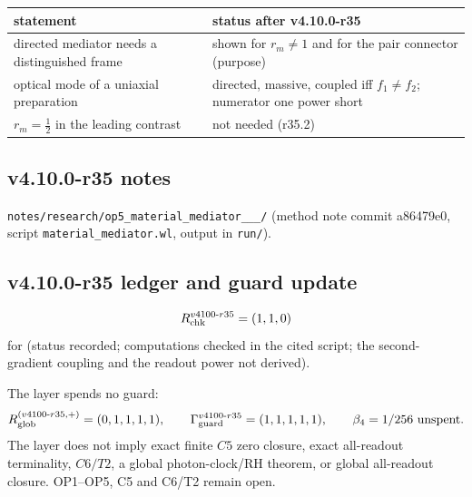 \begin{center}
\small
\begin{tabular}{@{}>{\raggedright\arraybackslash}p{}>{\raggedright\arraybackslash}p{}@{}}
\toprule
statement & status after v4.10.0-r35\\
\midrule
directed mediator needs a distinguished frame & shown for \(r_m\neq1\) and for the pair connector (purpose)\\
optical mode of a uniaxial preparation & directed, massive, coupled iff \(f_1\neq f_2\); numerator one power short\\
\(r_m=\tfrac12\) in the leading contrast & not needed (r35.2)\\
\bottomrule
\end{tabular}
\end{center}

\subsection*{v4.10.0-r35 notes}
\label{subsec:v4100-r35-notes}

\texttt{notes/\allowbreak research/\allowbreak op5\_\allowbreak material\_\allowbreak mediator\_\_\_/} (method note commit a86479e0,
script \texttt{material\_\allowbreak mediator.wl}, output in \texttt{run/}).

\subsection*{v4.10.0-r35 ledger and guard update}
\label{subsec:v4100-r35-ledger-guard}

\[
R_{\rm chk}^{v4100\text{-}r35}=(1,1,0)
\]
for (status recorded; computations checked in the cited script; the second-gradient coupling and the readout power not derived).

The layer spends no guard:
\[
R_{\rm glob}^{(v4100\text{-}r35,+)}=(0,1,1,1,1),
\qquad
\Gamma_{\rm guard}^{v4100\text{-}r35}=(1,1,1,1,1),
\qquad
\beta_4=1/256\ \text{unspent}.
\]
The layer does not imply exact finite \(C5\) zero closure, exact all-readout terminality, \(C6/T2\), a global photon-clock/RH theorem,
or global all-readout closure.  OP1--OP5, C5 and C6/T2 remain open.
